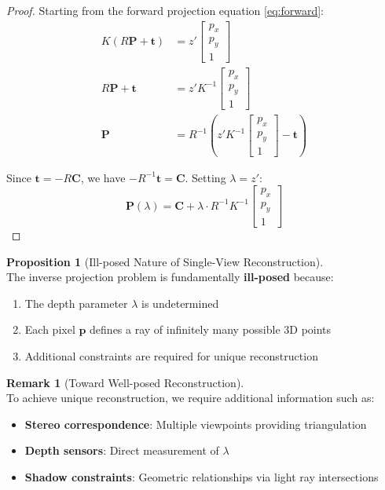 \documentclass[12pt]{article}
\newcommand{\vect}[1]{\bm{#1}}
\theoremstyle{definition}
\newtheorem{proposition}{Proposition}[section]
\newtheorem{remark}{Remark}[section]
\begin{document}
\begin{proof}
Starting from the forward projection equation \eqref{eq:forward}:
\begin{align}
K (R \vect{P} + \vect{t}) &= z' \begin{bmatrix} p_x \\ p_y \\ 1 \end{bmatrix} \\
R \vect{P} + \vect{t} &= z' K^{-1} \begin{bmatrix} p_x \\ p_y \\ 1 \end{bmatrix} \\
\vect{P} &= R^{-1} \left( z' K^{-1} \begin{bmatrix} p_x \\ p_y \\ 1 \end{bmatrix} - \vect{t} \right)
\end{align}

Since $\vect{t} = -R \vect{C}$, we have $-R^{-1} \vect{t} = \vect{C}$. Setting $\lambda = z'$:
\begin{equation}
\vect{P}(\lambda) = \vect{C} + \lambda \cdot R^{-1} K^{-1} \begin{bmatrix} p_x \\ p_y \\ 1 \end{bmatrix}
\end{equation}
\end{proof}

\begin{proposition}[Ill-posed Nature of Single-View Reconstruction] ~\\
The inverse projection problem is fundamentally \textbf{ill-posed} because:
\begin{enumerate}[label=(\alph*)]
    \item The depth parameter $\lambda$ is undetermined
    \item Each pixel $\vect{p}$ defines a ray of infinitely many possible 3D points
    \item Additional constraints are required for unique reconstruction
\end{enumerate}
\end{proposition}

\begin{remark}[Toward Well-posed Reconstruction] ~\\
To achieve unique reconstruction, we require additional information such as:
\begin{itemize}
    \item \textbf{Stereo correspondence}: Multiple viewpoints providing triangulation
    \item \textbf{Depth sensors}: Direct measurement of $\lambda$
    \item \textbf{Shadow constraints}: Geometric relationships via light ray intersections
\end{itemize}
\end{remark}
\end{document}
